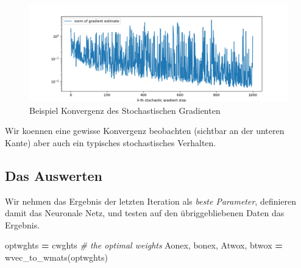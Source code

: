 \documentclass[
]{book}
\newenvironment{Shaded}{\begin{snugshade}}{\end{snugshade}}
\newcommand{\CommentTok}[1]{\textcolor[rgb]{0.56,0.35,0.01}{\textit{#1}}}
\newcommand{\NormalTok}[1]{#1}
\newcommand{\OperatorTok}[1]{\textcolor[rgb]{0.81,0.36,0.00}{\textbf{#1}}}
\theoremstyle{definition}
\theoremstyle{definition}
\theoremstyle{definition}
\theoremstyle{definition}
\theoremstyle{remark}
\begin{document}
\begin{figure}
\centering
\includegraphics{bilder/051_nnpeng_conv.png}
\caption{Beispiel Konvergenz des Stochastischen Gradienten}
\end{figure}

Wir koennen eine gewisse Konvergenz beobachten (sichtbar an der unteren Kante) aber auch ein typisches stochastisches Verhalten.

\hypertarget{das-auswerten}{%
\subsection{Das Auswerten}\label{das-auswerten}}

Wir nehmen das Ergebnis der letzten Iteration als \emph{beste Parameter}, definieren damit das Neuronale Netz, und testen auf den übriggebliebenen Daten das Ergebnis.

\begin{Shaded}
\begin{Highlighting}[]
\NormalTok{optwghts }\OperatorTok{=}\NormalTok{ cwghts  }\CommentTok{\# the optimal weights}
\NormalTok{Aonex, bonex, Atwox, btwox }\OperatorTok{=}\NormalTok{ wvec\_to\_wmats(optwghts)}
\end{Highlighting}
\end{Shaded}
\end{document}
